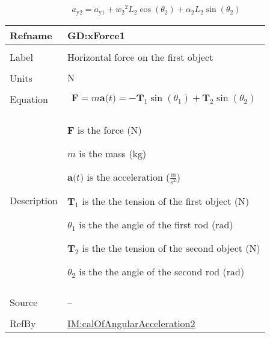 \documentclass[12pt]{article}
\begin{document}
\begin{displaymath}
{a_{\text{y}2}}={a_{\text{y}1}}+{w_{2}}^{2} {L_{2}} \cos\left({θ_{2}}\right)+{α_{2}} {L_{2}} \sin\left({θ_{2}}\right)
\end{displaymath}
\vspace{\baselineskip}
\noindent
\begin{minipage}{\textwidth}
\begin{tabular}{>{\raggedright}p{}>{\raggedright\arraybackslash}p{}}
\toprule \textbf{Refname} & \textbf{GD:xForce1}
\label{GD:xForce1}
\\ \midrule \\
Label & Horizontal force on the first object
        
\\ \midrule \\
Units & ${\text{N}}$
        
\\ \midrule \\
Equation & \begin{displaymath}
           \symbf{F}=m \symbf{a}\text{(}t\text{)}=-{\symbf{T}_{1}} \sin\left({θ_{1}}\right)+{\symbf{T}_{2}} \sin\left({θ_{2}}\right)
           \end{displaymath}
\\ \midrule \\
Description & \begin{symbDescription}
              \item{$\symbf{F}$ is the force (${\text{N}}$)}
              \item{$m$ is the mass (${\text{kg}}$)}
              \item{$\symbf{a}\text{(}t\text{)}$ is the acceleration ($\frac{\text{m}}{\text{s}^{2}}$)}
              \item{${\symbf{T}_{1}}$ is the the tension of the first object (${\text{N}}$)}
              \item{${θ_{1}}$ is the the angle of the first rod (${\text{rad}}$)}
              \item{${\symbf{T}_{2}}$ is the the tension of the second object (${\text{N}}$)}
              \item{${θ_{2}}$ is the the angle of the second rod (${\text{rad}}$)}
              \end{symbDescription}
\\ \midrule \\
Source & --
         
\\ \midrule \\
RefBy & \hyperref[IM:calOfAngularAcceleration2]{IM:calOfAngularAcceleration2}
        
\\ \bottomrule
\end{tabular}
\end{minipage}
\end{document}
